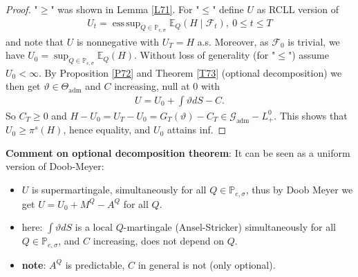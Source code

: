 \documentclass[12pt,a4paper, twoside]{article}
\theoremstyle{definition}
\newcommand{\EE}{\mathbb{E}} %
\newcommand{\PP}{\mathbb{P}} %
\DeclareMathOperator*{\esssup}{ess\,sup}
\begin{document}
\begin{proof} "$\geq$" was shown in Lemma \ref{L71}.
For "$\leq$" define $U$ as RCLL version of 
\begin{align*}
U_t = \esssup_{Q \in \mathbb{P}_{e, \sigma}} \EE_Q( H \mid \mathcal{F}_t), \ 0 \leq t \leq T
\end{align*}
and note that $U$ is nonnegative with $U_T=H$ a.s. Moreover, as $\mathcal{F}_0$ is trivial, we have $U_0 = \sup_{Q \in \PP_{e, \sigma}} \EE_Q(H)$. Without loss of generality (for "$\leq$") assume $U_0 < \infty$. 
\newpage
By Proposition \ref{P72} and Theorem \ref{T73} (optional decomposition) we then get $\vartheta \in \Theta_\text{adm}$ and $C$ increasing, null at $0$ with 
\begin{align*}
U = U_0 + \int \vartheta dS - C.
\end{align*}
So $C_T \geq 0$ and $H-U_0=U_T-U_0= G_T( \vartheta) - C_T \in \mathcal{G}_\text{adm}-L_+^0$. This shows that $U_0 \geq \pi^s(H)$, hence equality, and $U_0$ attains inf. 
\end{proof}
\noindent \textbf{Comment on optional decomposition theorem}: It can be seen as a uniform version of Doob-Meyer:
\begin{itemize}
\item $U$ is supermartingale, simultaneously for all $Q \in \PP_{e, \sigma}$, thus by Doob Meyer we get $U = U_0 + M^Q-A^Q$ for all $Q$. 
\item here: $\int \vartheta dS$ is a local $Q$-martingale (Ansel-Stricker) simultaneously for all $Q \in \PP_{e, \sigma}$, and $C$ increasing, does not depend on $Q$. 
\item \textbf{note}: $A^Q$ is predictable, $C$ in general is not (only optional). 
\end{itemize}
\end{document}
